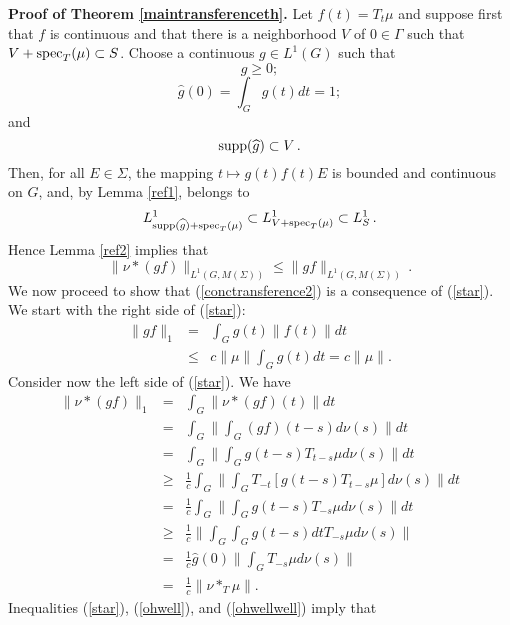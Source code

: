 \documentclass[12pt]{article}
\newcommand{\spec}{{\rm spec}}
\begin{document}
\noindent
{\bf Proof of Theorem \ref{maintransferenceth}.} 
Let $f(t)=T_t\mu$ and suppose first that 
$f$ is continuous and that there is a neighborhood $V$
of $0\in \Gamma$ such that $V+\spec_T(\mu)\subset S$.
Choose a continuous $g\in L^1(G)$
such that
$$g\geq 0;$$
$$\widehat{g}(0)= \int_G g(t)dt=1;$$
and
$${\rm supp}(\widehat{g})\subset V\,. $$
Then, for all $E\in\Sigma$, the mapping 
$t\mapsto g(t)f(t)E$ is bounded and continuous on $G$, and, by Lemma \ref{ref1},
belongs to
$$L^1_{{\rm supp}(\widehat{g})+\spec_T(\mu)}\subset L^1_{V+\spec_T(\mu)}\subset L^1_S\,.$$ 
Hence Lemma \ref{ref2} implies that
\begin{equation}
\|\nu*(gf)\|_{L^1(G,M(\Sigma))}\leq \|gf\|_{L^1(G,M(\Sigma))}\,.
\label{star}
\end{equation}
We now proceed to show that (\ref{conctransference2}) is 
a consequence of (\ref{star}).  
We start with the right side of (\ref{star}):
\begin{eqnarray}
\|gf\|_1         &=&     \int_Gg(t)\|f(t)\|dt \nonumber\\
		&\leq& c \|\mu\| \int_Gg(t) dt =c \|\mu\|.
\label{ohwell}
\end{eqnarray}
Consider now the left side of (\ref{star}).  We have
\begin{eqnarray}
\|\nu *(gf)\|_1            &=&     \int_G\|\nu *(gf)(t)\|dt \nonumber\\
		&=&     \int_G\|\int_G (gf) (t-s)d\nu(s)\| dt \nonumber\\
		&=& \int_G\|\int_G g (t-s) T_{t-s} \mu 
				d \nu (s)\| dt \nonumber\\
		&\geq&  \frac{1}{c} 
		\int_G\|\int_G T_{-t}\left[ g (t-s) T_{t-s} \mu 
				  \right]
				d \nu (s)\| dt \nonumber\\
		&=&     \frac{1}{c} 
		\int_G\|\int_G  g (t-s) T_{-s} \mu 
				d \nu (s)\| dt \nonumber\\
		&\geq&  \frac{1}{c} 
		\| \int_G \int_G  g (t-s) d t 
		 T_{-s} \mu 
				d \nu (s)\| \nonumber\\
		&=&     \frac{1}{c} \widehat{g}(0)
		\| \int_G  
		 T_{-s} \mu 
				d \nu (s)\| \nonumber\\
		&=&     \frac{1}{c}
		\| \nu*_T \mu \|.           
\label{ohwellwell}
\end{eqnarray}
Inequalities (\ref{star}), (\ref{ohwell}), and (\ref{ohwellwell}) imply that
\end{document}
